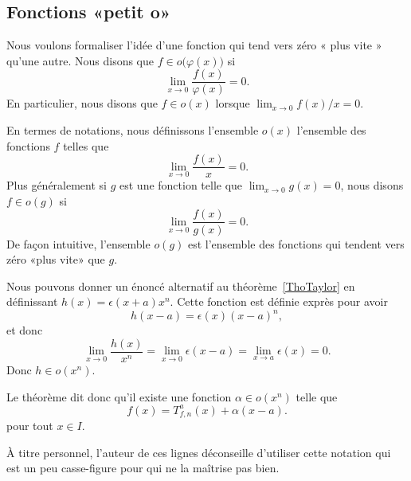 \subsection{Fonctions «petit o» }

Nous voulons formaliser l'idée d'une fonction qui tend vers zéro « plus vite » qu'une autre. Nous disons que \( f\in o\big(\varphi(x)\big)\) si
\begin{equation}
	\lim_{x\to 0} \frac{ f(x) }{ \varphi(x) }=0.
\end{equation}
En particulier, nous disons que \( f\in o(x)\) lorsque \( \lim_{x\to 0} f(x)/x=0\).


En termes de notations, nous définissons l'ensemble \( o(x)\) l'ensemble des fonctions \( f\) telles que
\begin{equation}
	\lim_{x\to 0} \frac{ f(x) }{ x }=0.
\end{equation}
Plus généralement si \( g\) est une fonction telle que \( \lim_{x\to 0} g(x)=0\), nous disons \( f\in o(g)\) si
\begin{equation}
	\lim_{x\to 0} \frac{ f(x) }{ g(x) }=0.
\end{equation}
De façon intuitive, l'ensemble \( o(g)\) est l'ensemble des fonctions qui tendent vers zéro «plus vite» que \( g\).

Nous pouvons donner un énoncé alternatif au théorème~\ref{ThoTaylor} en définissant \( h(x)=\epsilon(x+a)x^n\). Cette fonction est définie exprès pour avoir
\begin{equation}
	h(x-a)=\epsilon(x)(x-a)^n,
\end{equation}
et donc
\begin{equation}
	\lim_{x\to 0} \frac{ h(x) }{ x^n }=\lim_{x\to 0} \epsilon(x-a)=\lim_{x\to a}\epsilon(x)=0.
\end{equation}
Donc \( h\in o(x^n)\).

Le théorème dit donc qu'il existe une fonction \( \alpha\in o(x^n)\) telle que
\begin{equation}
	f(x)=T^a_{f,n}(x)+\alpha(x-a).
\end{equation}
pour tout \( x\in I\).

\begin{remark}
	À titre personnel, l'auteur de ces lignes déconseille d'utiliser cette notation qui est un peu casse-figure pour qui ne la maîtrise pas bien.
\end{remark}

